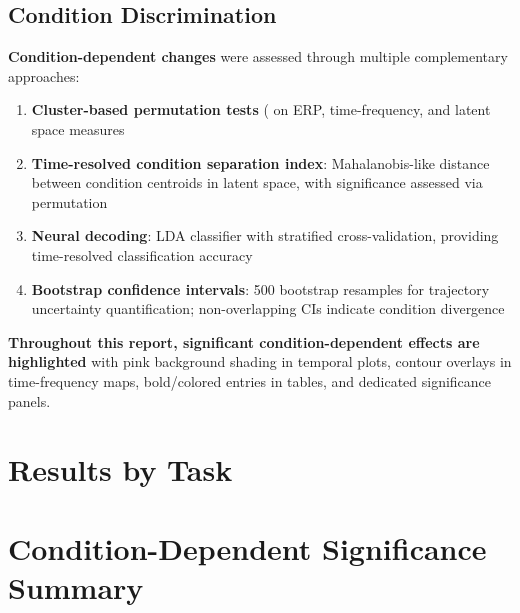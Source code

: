 \documentclass[10pt, letterpaper]{article}
\begin{document}
\subsection{Condition Discrimination}
\textbf{Condition-dependent changes} were assessed through multiple complementary approaches:
\begin{enumerate}[nosep]
    \item \textbf{Cluster-based permutation tests} (%
          on ERP, time-frequency, and latent space measures
    \item \textbf{Time-resolved condition separation index}: Mahalanobis-like distance between
          condition centroids in latent space, with significance assessed via permutation
    \item \textbf{Neural decoding}: LDA classifier with stratified %
          cross-validation, providing time-resolved classification accuracy
    \item \textbf{Bootstrap confidence intervals}: 500 bootstrap resamples for
          trajectory uncertainty quantification; non-overlapping CIs indicate condition divergence
\end{enumerate}

\noindent
\textcolor{sigcolor}{\textbf{Throughout this report, significant condition-dependent effects
are highlighted}} with pink background shading in temporal plots, contour overlays
in time-frequency maps, bold/colored entries in tables, and dedicated significance panels.

\section{Results by Task}


\section{Condition-Dependent Significance Summary}

\begin{tcolorbox}[colback=keybg, colframe=accentblue, title={\textbf{Cross-Task Condition Discrimination}}]
\end{tcolorbox}
\end{document}
